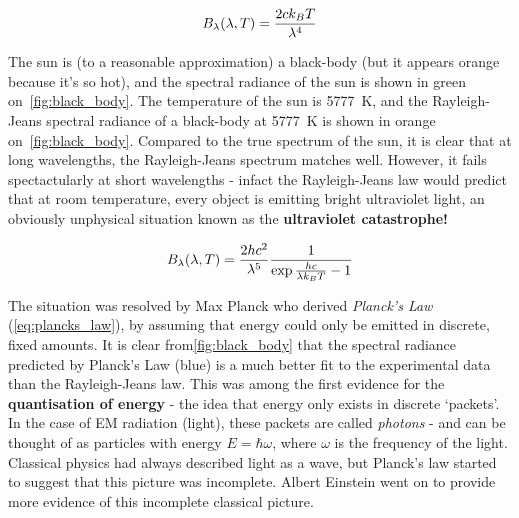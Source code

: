 \documentclass{memoir}[11pt,oneside,a4paper,openany]
\begin{document}
\begin{equation}\label{eq:rayleigh_jeans}
	\centering
	B_\lambda(\lambda,T) = \frac{2ck_B T}{\lambda^4}
\end{equation}

The sun is (to a reasonable approximation) a black-body (but it appears orange because it's so hot), and the spectral radiance of the sun is shown in green on~\autoref{fig:black_body}. The temperature of the sun is \SI{5777}{\kelvin}, and the Rayleigh-Jeans spectral radiance of a black-body at \SI{5777}{\kelvin} is shown in orange on~\autoref{fig:black_body}. Compared to the true spectrum of the sun, it is clear that at long wavelengths, the Rayleigh-Jeans spectrum matches well. However, it fails spectactularly at short wavelengths - infact the Rayleigh-Jeans law would predict that at room temperature, every object is emitting bright ultraviolet light, an obviously unphysical situation known as the \textbf{ultraviolet catastrophe!}

\begin{equation}\label{eq:plancks_law}
	\centering
	B_\lambda(\lambda, T) = \frac{2hc^2}{\lambda^5} \frac{1}{\exp{\frac{hc}{\lambda k_B T}}-1}
\end{equation}

The situation was resolved by Max Planck who derived \emph{Planck's Law} (\autoref{eq:plancks_law}), by assuming that energy could only be emitted in discrete, fixed amounts. It is clear from\autoref{fig:black_body} that the spectral radiance predicted by Planck's Law (blue) is a much better fit to the experimental data than the Rayleigh-Jeans law. This was among the first evidence for the \textbf{quantisation of energy} - the idea that energy only exists in discrete `packets'. In the case of EM radiation (light), these packets are called \emph{photons} - and can be thought of as particles with energy $E=\hbar\omega$, where $\omega$ is the frequency of the light. Classical physics had always described light as a wave, but Planck's law started to suggest that this picture was incomplete. Albert Einstein went on to provide more evidence of this incomplete classical picture.   
\end{document}
